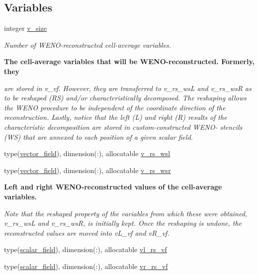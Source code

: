 \subsection*{Variables}
\begin{DoxyCompactItemize}
\item 
integer \hyperlink{namespacem__weno_a91b7a29671368f77d62ab0d3fd9ecff0}{v\+\_\+size}
\begin{DoxyCompactList}\small\item\em Number of W\+E\+N\+O-\/reconstructed cell-\/average variables. \end{DoxyCompactList}\end{DoxyCompactItemize}
\begin{Indent}\textbf{ The cell-\/average variables that will be W\+E\+N\+O-\/reconstructed. Formerly, they}\par
{\em are stored in v\+\_\+vf. However, they are transferred to v\+\_\+rs\+\_\+wsL and v\+\_\+rs\+\_\+wsR as to be reshaped (RS) and/or characteristically decomposed. The reshaping allows the W\+E\+NO procedure to be independent of the coordinate direction of the reconstruction. Lastly, notice that the left (L) and right (R) results of the characteristic decomposition are stored in custom-\/constructed W\+E\+N\+O-\/ stencils (WS) that are annexed to each position of a given scalar field. }\begin{DoxyCompactItemize}
\item 
type(\hyperlink{structm__derived__types_1_1vector__field}{vector\+\_\+field}), dimension(\+:), allocatable \hyperlink{namespacem__weno_a93ac8fcccd75977762710ff8c97e00cd}{v\+\_\+rs\+\_\+wsl}
\item 
type(\hyperlink{structm__derived__types_1_1vector__field}{vector\+\_\+field}), dimension(\+:), allocatable \hyperlink{namespacem__weno_acf9ad1f7c2c83efea07eecbdef783431}{v\+\_\+rs\+\_\+wsr}
\end{DoxyCompactItemize}
\end{Indent}
\begin{Indent}\textbf{ Left and right W\+E\+N\+O-\/reconstructed values of the cell-\/average variables.}\par
{\em Note that the reshaped property of the variables from which these were obtained, v\+\_\+rs\+\_\+wsL and v\+\_\+rs\+\_\+wsR, is initially kept. Once the reshaping is undone, the reconstructed values are moved into v\+L\+\_\+vf and v\+R\+\_\+vf. }\begin{DoxyCompactItemize}
\item 
type(\hyperlink{structm__derived__types_1_1scalar__field}{scalar\+\_\+field}), dimension(\+:), allocatable \hyperlink{namespacem__weno_a4f4ba6cc4536855c0302a88c05b8618e}{vl\+\_\+rs\+\_\+vf}
\item 
type(\hyperlink{structm__derived__types_1_1scalar__field}{scalar\+\_\+field}), dimension(\+:), allocatable \hyperlink{namespacem__weno_ad1481768af62b47f857535c4a08f20d0}{vr\+\_\+rs\+\_\+vf}
\end{DoxyCompactItemize}
\end{Indent}
